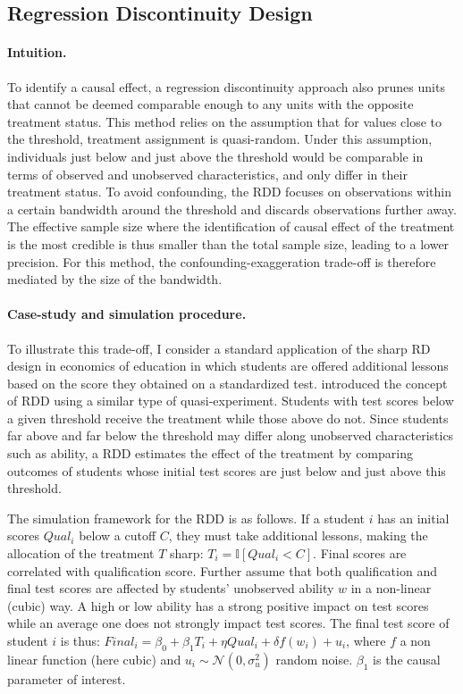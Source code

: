 \documentclass[usletter, 12pt]{article}
\begin{document}
		
		 \subsection{Regression Discontinuity Design}
		
     			\paragraph{Intuition.} To identify a causal effect, a regression discontinuity approach also prunes units that cannot be deemed comparable enough to any units with the opposite treatment status. This method relies on the assumption that for values close to the threshold, treatment assignment is quasi-random. Under this assumption, individuals just below and just above the threshold would be comparable in terms of observed and unobserved characteristics, and only differ in their treatment status. To avoid confounding, the RDD focuses on observations within a certain bandwidth around the threshold and discards observations further away. The effective sample size where the identification of causal effect of the treatment is the most credible is thus smaller than the total sample size, leading to a lower precision. For this method, the confounding-exaggeration trade-off is therefore mediated by the size of the bandwidth.
			
			\paragraph{Case-study and simulation procedure.} To illustrate this trade-off, I consider a standard application of the sharp RD design in economics of education in which students are offered additional lessons based on the score they obtained on a standardized test. \cite{thistlethwaite_regression-discontinuity_1960} introduced the concept of RDD using a similar type of quasi-experiment. Students with test scores below a given threshold receive the treatment while those above do not. Since students far above and far below the threshold may differ along unobserved characteristics such as ability, a RDD estimates the effect of the treatment by comparing outcomes of students whose initial test scores are just below and just above this threshold. 
        
        			 The simulation framework for the RDD is as follows. If a student $i$ has an initial scores $Qual_{i}$ below a cutoff $C$, they must take additional lessons, making the allocation of the treatment $T$ sharp: $T_i = \mathbb{I}[Qual_{i} < C]$. Final scores are correlated with qualification score. Further assume that both qualification and final test scores are affected by students' unobserved ability $w$ in a non-linear (cubic) way. A high or low ability has a strong positive impact on test scores while an average one does not strongly impact test scores. The final test score of student $i$ is thus: $Final_{i} = \beta_{0} + \beta_{1} T_i + \eta Qual_{i} +  \delta f(w_i) + u_{i}$, where $f$ a non linear function (here cubic) and $u_{i} \sim \mathcal{N}(0, \sigma_{u}^{2})$ random noise. $\beta_{1}$ is the causal parameter of interest. 
        
\end{document}
